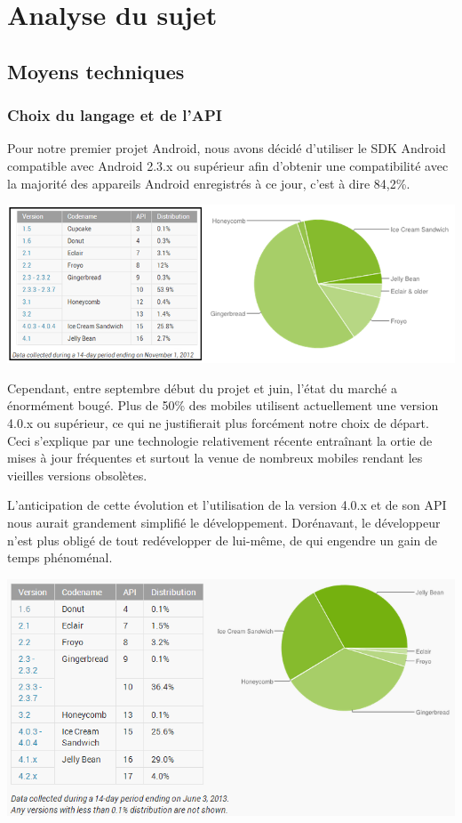 \documentclass{report}
\begin{document}
\section{Analyse du sujet}

\subsection{Moyens techniques}

\subsubsection{Choix du langage et de l'API}

Pour notre premier projet Android, nous avons décidé d’utiliser le SDK
Android compatible avec Android 2.3.x ou supérieur afin d’obtenir une
compatibilité avec la majorité des appareils Android enregistrés à ce
jour, c’est à dire 84,2\%.

\includegraphics[scale=0.75]{images/graph1}

Cependant, entre septembre début du projet et juin, l’état du marché a
énormément bougé.
Plus de 50\% des mobiles utilisent actuellement une version 4.0.x ou
supérieur, ce qui ne justifierait plus forcément notre choix de départ.
Ceci s’explique par une technologie relativement récente entraînant la
ortie de mises à jour fréquentes et surtout la venue de nombreux mobiles
rendant les vieilles versions obsolètes.

L’anticipation de cette évolution et l’utilisation de la version 4.0.x
et de son API nous aurait grandement simplifié le développement.
Dorénavant, le développeur n’est plus obligé de tout redévelopper de
lui-même, de qui engendre un gain de temps phénoménal.
\bigskip


\includegraphics[scale=0.75]{images/graph2}
\end{document}
